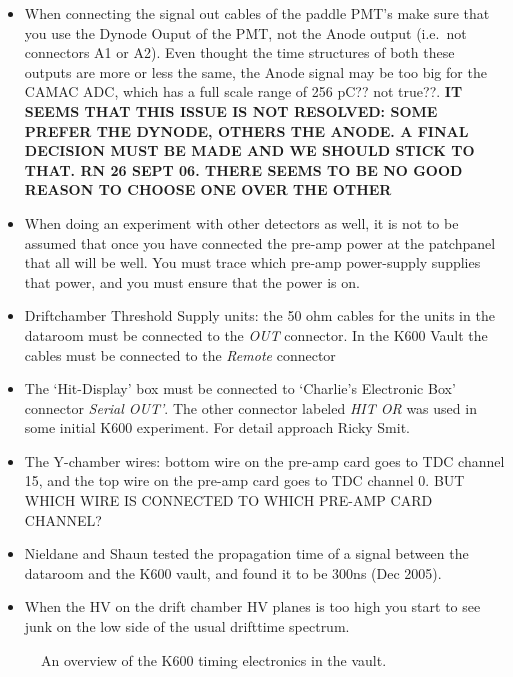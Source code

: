\documentclass[11pt]{report}
\begin{document}
\begin{itemize}
\item When connecting the signal out cables of the paddle PMT's make sure that you use the Dynode Ouput of the PMT, not the Anode output (i.e.~not connectors A1 or A2). Even thought the time structures of both these outputs are more or less the same, the Anode signal may be too big for the CAMAC ADC, which has a full scale range of 256 pC?? not true??. {\bf IT SEEMS THAT THIS ISSUE IS NOT RESOLVED: SOME PREFER THE DYNODE, OTHERS THE ANODE. A FINAL DECISION MUST BE MADE AND WE SHOULD STICK TO THAT. RN 26 SEPT 06. THERE SEEMS TO BE NO GOOD REASON TO CHOOSE ONE OVER THE OTHER}



\item When doing an experiment with other detectors as well, it is not 
to be assumed that once you have connected the pre-amp power at the patchpanel 
that all will be well. You must trace which pre-amp power-supply supplies
that power, and you must ensure that the power is on.

\item Driftchamber Threshold Supply units: the 50 ohm cables for the units in the
dataroom must be connected to the {\it OUT} connector. In the K600 Vault the cables must
be connected to the {\it Remote} connector

\item The `Hit-Display' box must be connected to `Charlie's Electronic Box' connector
{\it Serial OUT'}. The other connector labeled {\it HIT OR} was used in some initial
K600 experiment. For detail approach Ricky Smit.

\item The Y-chamber wires: bottom wire on the pre-amp card goes to TDC channel 15,
and the top wire on the pre-amp card goes to TDC channel 0.
BUT WHICH WIRE IS CONNECTED TO WHICH PRE-AMP CARD CHANNEL?


\item Nieldane and Shaun tested the propagation time of a signal between the dataroom and the 
K600 vault, and found it to be 300ns (Dec 2005).

\item When the HV on the drift chamber HV planes is too high you start to see junk on the low side of the usual drifttime spectrum.

\end{itemize}


\begin{figure}[!ht]
\centerline{\vspace{0cm}\hspace{0cm}
}
\centering
\caption{An overview of the K600 timing electronics in the vault.}
\label{fig:k600-electronics}
\end{figure} 
\end{document}
